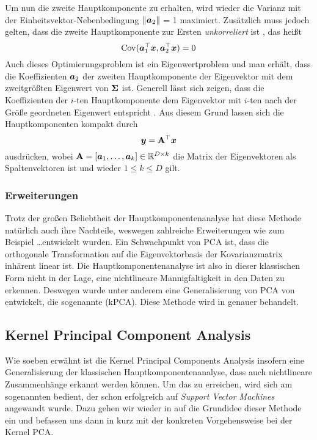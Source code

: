 Um nun die zweite Hauptkomponente zu erhalten, wird wieder die Varianz mit der
Einheitsvektor-Nebenbedingung $\left\lVert\bm{a}_2\right\rVert$ = 1 maximiert. Zusätzlich muss jedoch gelten,
dass die zweite Hauptkomponente zur Ersten \textit{unkorreliert} ist \parencite[5]{Jolliffe.2002}, das heißt
\begin{equation}
	\operatorname{Cov}(\bm{a}_1^\top\bm{x}, \bm{a}_2^\top\bm{x}) = 0
\end{equation}
Auch dieses Optimierungsproblem ist ein Eigenwertproblem und man erhält, dass die Koeffizienten $\bm{a}_2$ der zweiten Hauptkomponente der Eigenvektor mit dem zweitgrößten Eigenwert von $\mathbf{\Sigma}$ ist.
Generell lässt sich zeigen, dass die Koeffizienten der $i$-ten Hauptkomponente dem Eigenvektor mit $i$-ten nach der Größe geordneten Eigenwert entspricht \parencite[6]{Jolliffe.2002}. Aus diesem Grund lassen sich die Hauptkomponenten kompakt durch
\begin{equation}
	\bm{y} = \mathbf{A}^\top \bm{x}
\end{equation}
ausdrücken, wobei $\mathbf{A} = [\bm{a}_1,\ldots,\bm{a}_k] \in \mathbb{R}^{D \times k}$ die Matrix der Eigenvektoren als Spaltenvektoren ist und wieder $1 \leq k \leq D$ gilt.

\subsubsection{Erweiterungen}
\label{ch:MethodenDerDimRed:statistisch:PCA:Erweiterungen}
Trotz der großen Beliebtheit der Hauptkomponentenanalyse hat diese Methode natürlich auch ihre Nachteile, weswegen zahlreiche Erweiterungen wie zum Beispiel \ldots\addref entwickelt wurden.
Ein Schwachpunkt von PCA ist, dass die orthogonale Transformation auf die Eigenvektorbasis der Kovarianzmatrix inhärent linear ist. Die Hauptkomponentenanalyse ist also in dieser klassischen Form nicht in der Lage, eine nichtlineare Mannigfaltigkeit in den Daten zu erkennen. Deswegen wurde unter anderem eine Generalisierung von PCA von \textcite{Scholkopf.1997} entwickelt, die sogenannte  (kPCA). Diese Methode wird in  genauer behandelt.

\subsection{Kernel Principal Component Analysis}
\label{ch:MethodenDerDimRed:statistisch:kPCA}
Wie soeben erwähnt ist die Kernel Principal Components Analysis insofern eine Generalisierung der klassischen Hauptkomponentenanalyse, dass auch nichtlineare Zusammenhänge erkannt werden können.
Um das zu erreichen, wird sich am sogenannten  bedient, der schon erfolgreich auf \textit{Support Vector Machines} \parencite{Boser.1992} angewandt wurde. Dazu gehen wir wieder in
 auf die Grundidee dieser Methode ein
und befassen uns dann in  kurz mit
der konkreten Vorgehensweise bei der Kernel PCA.

